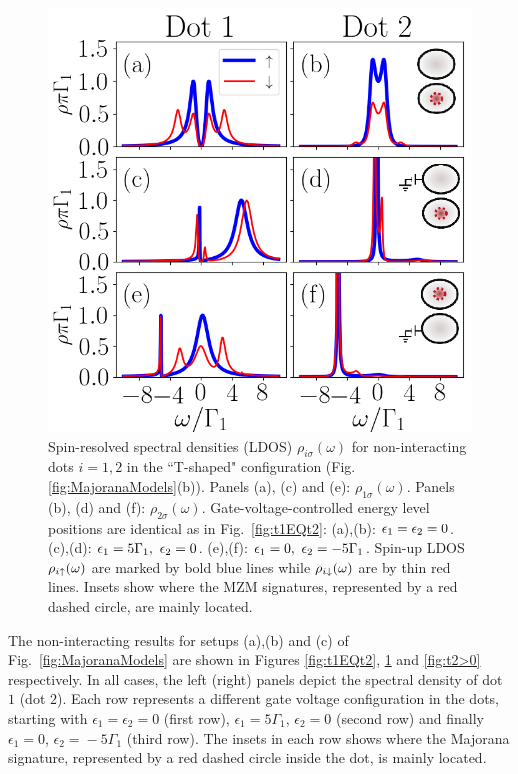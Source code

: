 \documentclass[showpacs,aps,prb,reprint,superscriptaddress]{revtex4-2}
\begin{document}
     

\begin{figure}[bt]
\begin{center}
\includegraphics[scale=0.48]{Graficos/t1gt0.png}
\caption{  \label{fig:t1>0}  Spin-resolved spectral densities (LDOS) $\rho_{i \sigma}(\omega)$ for non-interacting  dots $i=1,2$ in the ``T-shaped" configuration (Fig.\ref{fig:MajoranaModels}(b)). Panels (a), (c) and (e): $\rho_{1 \sigma}(\omega)$. Panels (b), (d) and  (f): $\rho_{2 \sigma}(\omega)$. Gate-voltage-controlled energy level  positions are identical as in Fig.\ \ref{fig:t1EQt2}: (a),(b): $\epsilon_1=\epsilon_2=0$. (c),(d): $\epsilon_1=5\Gamma_1, \ \epsilon_2 =0$.  (e),(f): $\epsilon_1=0, \ \epsilon_2 =-5\Gamma_1$.  Spin-up LDOS $\rho_{i \uparrow}(\omega)$ are marked by bold blue lines while $\rho_{i \downarrow}(\omega)$ are by thin red lines. Insets show where the MZM signatures, represented by a red dashed circle, are mainly located. 
%
}
%
\end{center}
\end{figure}


     The non-interacting results for setups (a),(b) and (c) of Fig.\ \ref{fig:MajoranaModels} are shown in Figures \ref{fig:t1EQt2}, \ref{fig:t1>0} and \ref{fig:t2>0} respectively. In all cases, the left (right) panels depict the spectral density  of dot $1$ (dot $2$). Each row represents a different gate voltage configuration in the dots, starting with  $\epsilon_1\!=\!\epsilon_2\!=\!0$ (first row), $\epsilon_1\!=\!5\Gamma_1$, $\epsilon_2\!=\!0$ (second row) and finally $\epsilon_1\!=\!0$, $\epsilon_2\!=\!\!-5\Gamma_1$ (third row). The insets in each row shows where the Majorana signature, represented by a red dashed circle inside the dot, is mainly located. 
\end{document}
